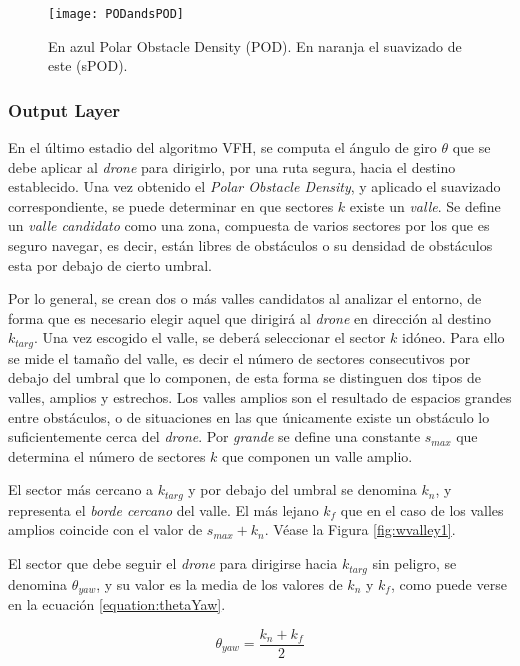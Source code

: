 \begin{figure}[H]
	\centering
	\texttt{[image: PODandsPOD]}
	\caption[POD vs smoothPOD.]{En azul Polar Obstacle Density (POD). En naranja el suavizado de este (sPOD).}\label{fig:PODandsPOD}
\end{figure}

\subsubsection{Output Layer}
\label{subsubsec:OL}
En el último estadio del algoritmo VFH, se computa el ángulo de giro $\theta$ que se debe aplicar al \emph{drone} para dirigirlo, por una ruta segura, hacia el destino establecido.
Una vez obtenido el \textit{Polar Obstacle Density}, y aplicado el suavizado correspondiente, se puede determinar en que sectores $k$ existe un \textit{valle}. Se define un \textit{valle candidato} como una zona, compuesta de varios sectores por los que es seguro navegar, es decir, están libres de obstáculos o su densidad de obstáculos esta por debajo de cierto umbral. 

Por lo general, se crean dos o más valles candidatos al analizar el entorno, de forma que es necesario elegir aquel que dirigirá al \emph{drone} en dirección al destino $k_\mathit{targ}$. Una vez escogido el valle, se deberá seleccionar el sector $k$ idóneo. Para ello se mide el tamaño del valle, es decir el número de sectores consecutivos por debajo del umbral que lo componen, de esta forma se distinguen dos tipos de valles, amplios y estrechos. 
Los valles amplios son el resultado de espacios grandes entre obstáculos, o de situaciones en las que únicamente existe un obstáculo lo suficientemente cerca del \emph{drone}. Por \textit{grande} se define una constante $s_\mathit{max}$ que determina el número de sectores $k$ que componen un valle amplio.

El sector más cercano a $k_\mathit{targ}$ y por debajo del umbral se denomina $k_n$, y representa el \textit{borde cercano} del valle. El más lejano $k_f$ que en el caso de los valles amplios coincide con el valor de $s_\mathit{max} + k_n$.  Véase la Figura \ref{fig:wvalley1}.

El sector que debe seguir el \emph{drone} para dirigirse hacia $k_\mathit{targ}$ sin peligro, se denomina $\theta_\mathit{yaw}$, y su valor es la media de los valores de $k_n$ y $k_f$, como puede verse en la ecuación \ref{equation:thetaYaw}.

\begin{equation}
\theta_\mathit{yaw} = \frac{k_n + k_f}{2}
\label{equation:thetaYaw}
\end{equation}


